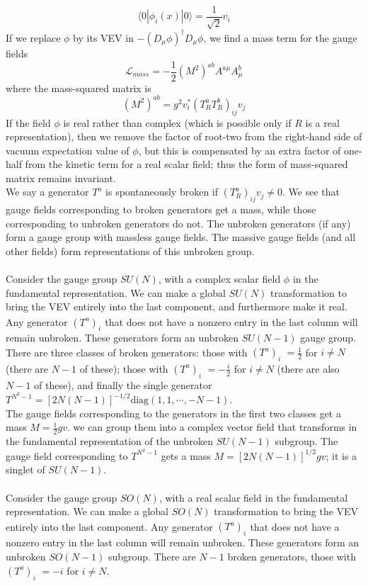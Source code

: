 \documentclass[cyan]{elegantnote}
\begin{document}
\[\langle 0 | \phi_i(x) | 0 \rangle = \frac{1}{\sqrt{2}}v_i\]
If we replace $\phi$ by its VEV in $-(D_{\mu}\phi)^{\dagger}D_{\mu}\phi$, we find a mass term for the gauge fields
\[\mathcal{L}_{mass} = - \frac{1}{2}(M^2)^{ab}A^{a\mu}A^b_{\mu}\]
where the mass-squared matrix is
\[(M^2)^{ab} = g^2 v_i^* (T^a_R T^b_R)_{ij}v_j \]
If the field $\phi$ is real rather than complex (which is possible only if $R$ is a real representation), then we remove the factor of root-two from the right-hand side of vacuum expectation value of $\phi$, but this is compensated by an extra factor of one-half from the kinetic term for a real scalar field; thus the form of mass-squared matrix remains invariant.
\\
We say a generator $T^a$ is spontaneously broken if $(T^a_R)_{ij}v_j \neq 0$. We see that gauge fields corresponding to broken generators get a mass, while those corresponding to unbroken generators do not. The unbroken generators (if any) form a gauge group with massless gauge fields. The massive gauge fields (and all other fields) form
representations of this unbroken group.
\\ \\
Consider the gauge group $SU(N)$, with a complex scalar field $\phi$ in the fundamental representation. We can make a global $SU(N)$ transformation to bring the VEV entirely into the last component, and furthermore make it real. 
Any generator $(T^a)_{i}^{\phantom{j}}$ that does not have a nonzero entry in the last column will remain unbroken. These generators form an unbroken $SU(N-1)$ gauge group. There are three classes of broken generators: those with $(T^a)_{i}^{\phantom{N}} = \frac{1}{2}$  for $i \neq N$ (there are $N-1$ of these); those with
$(T^a)_{i}^{\phantom{N}} = -\frac{i}{2}$  for $i \neq N$ (there are also $N - 1$ of these), and finally the single
generator $T^{N^2 - 1} = [2N(N-1)]^{-1/2} \mathrm{diag}(1,1,\cdots,-N-1)$. 
\\
The gauge fields corresponding to the generators in the first two classes get a mass $M = \frac{1}{2}gv$.
we can group them into a complex vector field that transforms in the fundamental representation of the unbroken $SU(N-1)$ subgroup. The gauge field corresponding to $T^{N^2-1}$ gets a mass $M = [2N(N-1)]^{1/2}gv$; it is a singlet of $SU(N-1)$.
\\ \\
Consider the gauge group $SO(N)$, with a real scalar field in the fundamental representation. We can make a global $SO(N)$ transformation to bring the VEV entirely into the last component. Any generator $(T^a)_{i}^{\phantom{j}}$ that does not have a nonzero entry in the last column will remain unbroken. These generators form an unbroken $SO(N-1)$ subgroup. There are $N - 1$ broken generators, those with $(T^a)_{i}^{\phantom{N}} = -i$  for $i \neq N$. 
\end{document}
